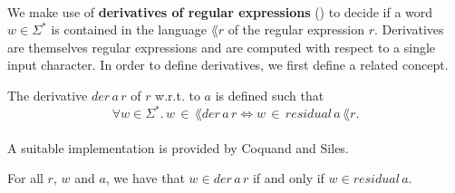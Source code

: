     \paragraph{}
    We make use of \textbf{derivatives of regular expressions} (\cite{DBLP:journals/jacm/Brzozowski64}) to decide if a word $w \in \Sigma^*$ is contained in the language $\lang{r}$ of the regular expression $r$. 
    Derivatives are themselves regular expressions and are computed with respect to a single input character. 
    In order to define derivatives, we first define a related concept.


    \begin{definition}{}
        \label{derivative}
        The derivative $der \,  a \, r$ of $r$ w.r.t. to $a$ is defined such that 
        \begin{equation*}       \forall w \in \Sigma^*. \, w \, \in \, \lang{der \, a \, r} \Leftrightarrow w \, \in \, residual \, a \, \lang{r}. \end{equation*}
        \end{definition}

        \paragraph{}
        A suitable implementation is provided by Coquand and Siles.



        \begin{theorem}
            \label{der_correct}
            For all $r$, $w$ and $a$, we have that $w \in der \, a \, r$ if and only if $w \in residual \, a $.
        \end{theorem}


